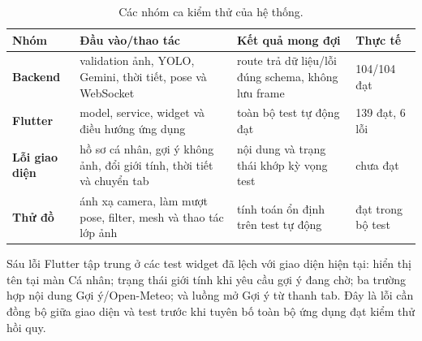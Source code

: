 \begin{table}[H]
\centering
\caption{Các nhóm ca kiểm thử của hệ thống.}
\label{tab:kiemthu}
\footnotesize
\begin{tabularx}{\textwidth}{>{\bfseries\color{daunavy}}l >{\raggedright\arraybackslash}X >{\raggedright\arraybackslash}X >{\color{daumaroon}}l}
\toprule
\rowcolor{gray100}\bfseries\color{daunavy}Nhóm & \bfseries\color{daumaroon}Đầu vào/thao tác & \bfseries\color{daunavy}Kết quả mong đợi & \bfseries\color{daumaroon}Thực tế \\
\midrule
Backend & validation ảnh, YOLO, Gemini, thời tiết, pose và WebSocket & route trả dữ liệu/lỗi đúng schema, không lưu frame & 104/104 đạt \\
Flutter & model, service, widget và điều hướng ứng dụng & toàn bộ test tự động đạt & 139 đạt, 6 lỗi \\
Lỗi giao diện & hồ sơ cá nhân, gợi ý không ảnh, đổi giới tính, thời tiết và chuyển tab & nội dung và trạng thái khớp kỳ vọng test & chưa đạt \\
Thử đồ & ánh xạ camera, làm mượt pose, filter, mesh và thao tác lớp ảnh & tính toán ổn định trên test tự động & đạt trong bộ test \\
\bottomrule
\end{tabularx}
\end{table}

Sáu lỗi Flutter tập trung ở các test widget đã lệch với giao diện hiện tại:
hiển thị tên tại màn Cá nhân; trạng thái giới tính khi yêu cầu gợi ý đang chờ;
ba trường hợp nội dung Gợi ý/Open-Meteo; và luồng mở Gợi ý từ thanh tab. Đây
là lỗi cần đồng bộ giữa giao diện và test trước khi tuyên bố toàn bộ ứng dụng
đạt kiểm thử hồi quy.

